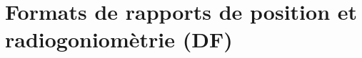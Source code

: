 \chapter[FORMATS DE RAPPORTS DE POSITION ET RADIOGONIOMÈTRIE (DF)]{Formats de rapports de position et
radiogoniomètrie (DF)}\label{formats-de-rapports-de-position-et-radiogoniomètrie (DF)}

\newcommand{\cheightspace}[1]{%
  \begingroup
  \strut{\cheightspacesymbolfont #1}%
  \endgroup
}
\newenvironment{cheightformatbox}[1]{%
  \par\medskip\begingroup
  \setlength{\arrayrulewidth}{0.6pt}%
  \begin{center}%
  \begin{tabular}{|p{0.92\textwidth}|}%
  \hline
  \cellcolor{gray!20}\hspace{0.6em}\sffamily\bfseries\itshape #1\\%
  \hline
  \begin{minipage}{0.98\linewidth}%
  \vspace{0.35em}%
}{%
  \vspace{0.35em}%
  \end{minipage}\\%
  \hline
  \end{tabular}%
  \end{center}%
  \endgroup\par\medskip
}
\newcommand{\chEightHead}[1]{\shortstack{\sffamily\bfseries\itshape #1}}
\newcommand{\chEightPositionHead}[1]{%
  \parbox[c][50pt][c]{\linewidth}{\centering\sffamily\bfseries\itshape #1\par}%
}
\newcommand{\chEightDataExtensionHead}{%
  \makebox[\linewidth][c]{%
  \begin{tabular}{@{}>{\centering\arraybackslash\sffamily\bfseries\itshape}p{\dimexpr\linewidth+2\tabcolsep\relax}@{}}
  Course/Speed \\
  \hline
  Power/Height/Gain/Dir \\
  \hline
  Radio Range \\
  \hline
  DF Signal Strength
  \end{tabular}}%
}
\newcommand{\chEightProto}[1]{\aprsorigtexttt{#1}}
\newcommand{\chEightFitProto}[1]{\resizebox{\linewidth}{!}{\aprsorigtexttt{#1}}}
\newcommand{\chEightBytes}[1]{%
  \makebox[0pt][r]{Bytes:\hspace{1.2em}}%
  \makebox[\linewidth][c]{#1}%
}
\newcommand{\chEightExampleText}[1]{{\rmfamily\small #1}}

